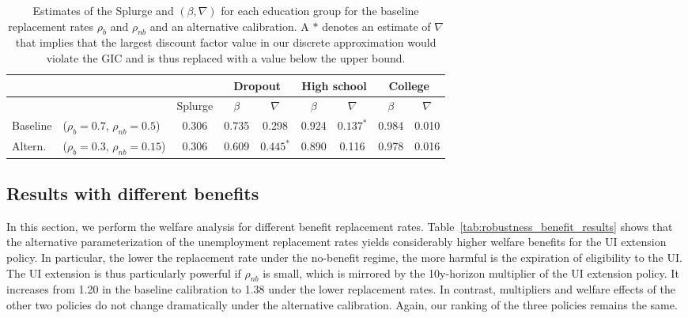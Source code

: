 \documentclass[\latexroot/\projectname]{subfiles}
\begin{document}
\begin{table}[t]
  \begin{center}
    \small
    \begin{tabular}
      {@{}llc|cccccc@{}}
      \toprule
               &                                            &         & \multicolumn{2}{c}{Dropout} & \multicolumn{2}{c}{High school} & \multicolumn{2}{c}{College}                                    \\ \midrule
               &                                            & Splurge & $\beta$                     & $\nabla$                        & $\beta$                     & $\nabla$    & $\beta$ & $\nabla$ \\ \midrule
      Baseline & ($\rho_{b}\!=\!0.7$, $\rho_{nb}\!=\!0.5$)  & 0.306   & 0.735                       & 0.298                           & 0.924                       & $0.137^{*}$ & 0.984   & 0.010    \\
      Altern.  & ($\rho_{b}\!=\!0.3$, $\rho_{nb}\!=\!0.15$) & 0.306   & 0.609                       & $0.445^{*}$                     & 0.890                       & 0.116       & 0.978   & 0.016
      \\ \bottomrule
    \end{tabular}
  \end{center}
  \caption{Estimates of the Splurge and $(\beta,\nabla)$ for each education group for the baseline replacement rates $\rho_{b}$ and $\rho_{nb}$ and an alternative calibration.
    A $*$ denotes an estimate of $\nabla$ that implies that the largest discount factor value in our discrete approximation would violate the GIC and is thus replaced with a value below the upper bound.}
  \whenintegrated{\label{tab:robustness_benefits}} 
\end{table}

\FloatBarrier
\subsection*{Results with different benefits}
\whenintegrated{\label{sec:robust_benefits_results}} 

In this section, we perform the welfare analysis for different benefit replacement rates.
Table~\ref{tab:robustness_benefit_results} shows that the alternative parameterization of the unemployment replacement rates yields considerably higher welfare benefits for the UI extension policy.
In particular, the lower the replacement rate under the no-benefit regime, the more harmful is the expiration of eligibility to the UI.
The UI extension is thus particularly powerful if $\rho_{nb}$ is small, which is mirrored by the 10y-horizon multiplier of the UI extension policy.
It increases from 1.20 in the baseline calibration to 1.38 under the lower replacement rates.
In contrast, multipliers and welfare effects of the other two policies do not change dramatically under the alternative calibration.
Again, our ranking of the three policies remains the same.
\end{document}
